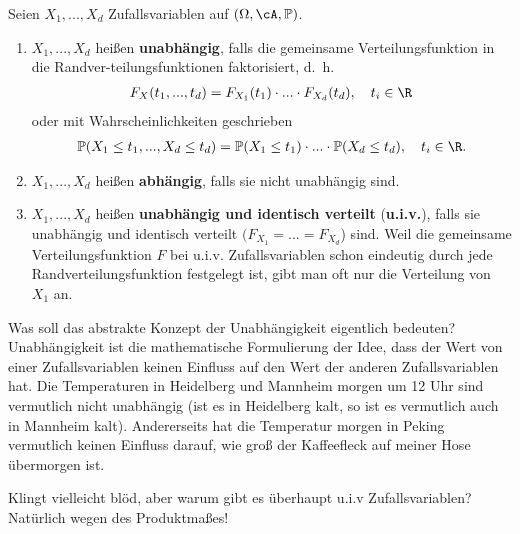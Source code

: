 \begin{deff}
	Seien $X_1,...,X_d$ Zufallsvariablen auf $(\Omega, \cA, \mathbb{P})$. 
	\begin{enumerate}[label=(\roman*)]
		\item $X_1,...,X_d$ hei\ss en \textbf{unabhängig}, falls die gemeinsame Verteilungsfunktion in die Randver-teilungsfunktionen faktorisiert, \mbox{d. h.}
		\begin{align*}
			F_X(t_1,...,t_d) = F_{X_1}(t_1) \cdot ... \cdot F_{X_d}(t_d), \quad t_i \in \R 
		\end{align*}
		oder mit Wahrscheinlichkeiten geschrieben
		\begin{align*}
			 \mathbb{P}(X_1 \leq t_1,...,X_d \leq t_d) = \mathbb{P}(X_1 \leq t_1) \cdot ... \cdot \mathbb{P}(X_d \leq t_d), \quad t_i \in \R.
		\end{align*}
		\item $X_1,...,X_d$ hei\ss en \textbf{abhängig}, falls sie nicht unabhängig sind.
		\item $X_1,...,X_d$ hei\ss en \textbf{unabh\"angig und identisch verteilt} (\textbf{u.i.v.}), falls sie unabh\"angig und identisch verteilt $(F_{X_1}=...=F_{X_d}$) sind. Weil die gemeinsame Verteilungsfunktion $F$ bei u.i.v. Zufallsvariablen schon eindeutig durch jede Randverteilungsfunktion festgelegt ist, gibt man oft nur die Verteilung von $X_1$ an.
	\end{enumerate}
\end{deff}
Was soll das abstrakte Konzept der Unabh\"angigkeit eigentlich bedeuten? Unabh\"angigkeit ist die mathematische Formulierung der Idee, dass der Wert von einer Zufallsvariablen keinen Einfluss auf den Wert der anderen Zufallsvariablen hat. Die Temperaturen in Heidelberg und Mannheim morgen um 12 Uhr sind vermutlich nicht unabh\"angig (ist es in Heidelberg kalt, so ist es vermutlich auch in Mannheim kalt). Andererseits hat die Temperatur morgen in Peking vermutlich keinen Einfluss darauf, wie gro\ss{} der Kaffeefleck auf meiner Hose \"ubermorgen ist.\smallskip


Klingt vielleicht bl\"od, aber warum gibt es \"uberhaupt u.i.v Zufallsvariablen? Nat\"urlich wegen des Produktma\ss es!

